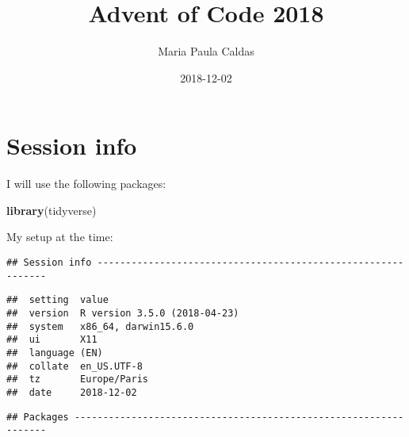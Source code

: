 \documentclass[]{book}
\title{Advent of Code 2018}
\author{Maria Paula Caldas}
\date{2018-12-02}
\newenvironment{Shaded}{\begin{snugshade}}{\end{snugshade}}
\newcommand{\KeywordTok}[1]{\textcolor[rgb]{0.13,0.29,0.53}{\textbf{#1}}}
\newcommand{\NormalTok}[1]{#1}
\theoremstyle{definition}
\theoremstyle{definition}
\theoremstyle{definition}
\theoremstyle{remark}
\begin{document}
\maketitle

{
\setcounter{tocdepth}{1}
\tableofcontents
}
\chapter*{Session info}\label{session-info}

I will use the following packages:

\begin{Shaded}
\begin{Highlighting}[]
\KeywordTok{library}\NormalTok{(tidyverse)}
\end{Highlighting}
\end{Shaded}

My setup at the time:

\begin{verbatim}
## Session info -------------------------------------------------------------
\end{verbatim}

\begin{verbatim}
##  setting  value                       
##  version  R version 3.5.0 (2018-04-23)
##  system   x86_64, darwin15.6.0        
##  ui       X11                         
##  language (EN)                        
##  collate  en_US.UTF-8                 
##  tz       Europe/Paris                
##  date     2018-12-02
\end{verbatim}

\begin{verbatim}
## Packages -----------------------------------------------------------------
\end{verbatim}
\end{document}

